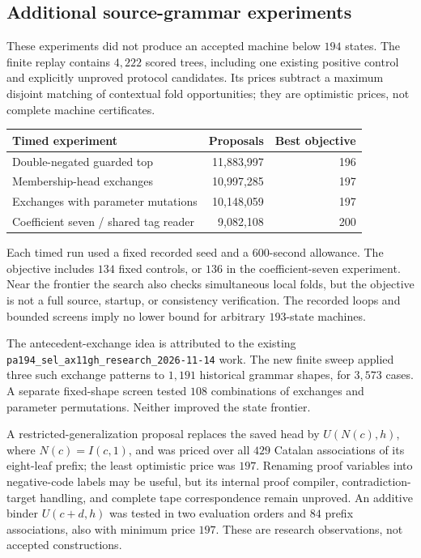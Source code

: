 \subsection{Additional source-grammar experiments}
These experiments did not produce an accepted machine below $194$ states.
The finite replay contains $4{,}222$ scored trees, including one existing
positive control and explicitly unproved protocol candidates. Its prices
subtract a maximum disjoint matching of contextual fold opportunities;
they are optimistic prices, not complete machine certificates.
\begin{center}\small
\begin{tabular}{lrr}
\hline
Timed experiment & Proposals & Best objective\\\hline
Double-negated guarded top & 11{,}883{,}997 & 196\\
Membership-head exchanges & 10{,}997{,}285 & 197\\
Exchanges with parameter mutations & 10{,}148{,}059 & 197\\
Coefficient seven / shared tag reader & 9{,}082{,}108 & 200\\
\hline
\end{tabular}
\end{center}
Each timed run used a fixed recorded seed and a $600$-second allowance.
The objective includes $134$ fixed controls, or $136$ in the coefficient-seven
experiment. Near the frontier the search also checks simultaneous local folds,
but the objective is not a full source, startup, or consistency verification.
The recorded loops and bounded screens imply no lower bound for arbitrary
$193$-state machines.

The antecedent-exchange idea is attributed to the existing
\texttt{pa194\_sel\_ax11gh\_research\_2026-11-14} work. The new finite sweep
applied three such exchange patterns to $1{,}191$ historical grammar shapes,
for $3{,}573$ cases. A separate fixed-shape screen tested $108$ combinations
of exchanges and parameter permutations. Neither improved the state frontier.

A restricted-generalization proposal replaces the saved head by
$U(N(c),h)$, where $N(c)=I(c,1)$, and was priced over all $429$ Catalan
associations of its eight-leaf prefix; the least optimistic price was $197$.
Renaming proof variables into negative-code labels may be useful, but its
internal proof compiler, contradiction-target handling, and complete tape
correspondence remain unproved. An additive binder $U(c+d,h)$ was tested
in two evaluation orders and $84$ prefix associations, also with minimum
price $197$. These are research observations, not accepted constructions.
